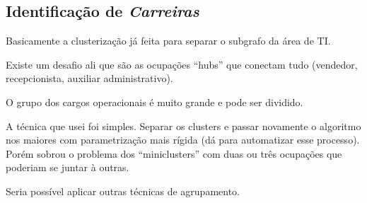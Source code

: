\documentclass[12pt,a4paper]{article}
\theoremstyle{hypo}
\begin{document}
\subsection{Identificação de \textit{Carreiras}}

Basicamente a clusterização já feita para separar o subgrafo da área de TI.

Existe um desafio ali que são as ocupações \enquote{hubs} que conectam tudo (vendedor, recepcionista, auxiliar administrativo).

O grupo dos cargos operacionais é muito grande e pode ser dividido.

A técnica que usei foi simples. Separar os clusters e passar novamente o algoritmo nos maiores com parametrização mais rígida (dá para automatizar esse processo). Porém sobrou o problema dos \enquote{miniclusters} com duas ou três ocupações que poderiam se juntar à outras.

Seria possível aplicar outras técnicas de agrupamento.

\def\refname{REFERÊNCIAS BIBLIOGRÁFICAS}


\end{document}
